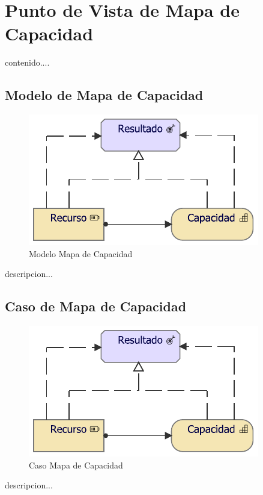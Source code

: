 \section{Punto de Vista de Mapa de Capacidad}
contenido....
\subsection{Modelo de Mapa de Capacidad}
\begin{figure}[h!]
	\centering
	\includegraphics[width=.5\linewidth]{imgs/modelo/MapaCapacidad}
	\caption{Modelo Mapa de Capacidad}
\end{figure}
descripcion...

\newpage

\subsection{Caso de Mapa de Capacidad}
\begin{figure}[h!]
	\centering
	\includegraphics[width=.5\linewidth]{imgs/caso/MapaCapacidad}
	\caption{Caso Mapa de Capacidad}
\end{figure}
descripcion...